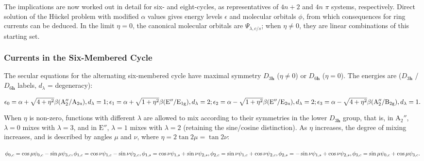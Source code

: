 The implications are now worked out in detail for six- and eight-cycles, as representatives of $4n+2$ and $4n$ $\pi$
systems, respectively.  Direct solution of the H\"uckel problem with modified $\alpha$ values gives energy levels {$\epsilon$}
and molecular orbitals {$\phi$}, from which consequences for ring currents can be deduced. In the limit $\eta = 0$,
the canonical molecular orbitals are {$\Psi_{\lambda,c/s}$}; when $\eta \ne 0$, they are linear combinations
of this starting set.

\subsubsection{Currents in the Six-Membered Cycle}

The secular equations for the alternating six-membered cycle
have maximal symmetry $D_{3\mathbf{h}}$ ($\eta \ne 0$) or $D_{6\mathbf{h}}$ ($\eta = 0$). The energies are ($D_{3\mathbf{h}}$ /$D_{6\mathbf{h}}$ labels,
$d_\lambda$ = degeneracy): 

\begin{math}
\\
\epsilon_0 = \alpha + \sqrt{4+\eta^2}\beta(\mathrm{A}_2''/\mathrm{A}_{2\mathrm{u}}), d_\lambda = 1;
\\
\\
\epsilon_1 = \alpha + \sqrt{1+\eta^2}\beta(\mathrm{E}''/\mathrm{E}_{1\mathrm{g}}), d_\lambda = 2;
\\
\\
\epsilon_2 = \alpha - \sqrt{1+\eta^2}\beta(\mathrm{E}''/\mathrm{E}_{2\mathrm{u}}), d_\lambda = 2;
\\
\\
\epsilon_3 = \alpha - \sqrt{4+\eta^2}\beta(\mathrm{A}_2''/\mathrm{B}_{2\mathrm{g}}), d_\lambda = 1.
\\
\\
\end{math}

When $\eta$ is non-zero, functions with different $\lambda$ are allowed to mix according to their symmetries in
the lower $D_{3\mathbf{h}}$ group, that is, in $\mathrm{A}_2''$, $\lambda = 0$ mixes with $\lambda = 3$, and in
$\mathrm{E}''$, $\lambda = 1$ mixes with $\lambda = 2$ (retaining the sine/cosine distinction).  As $\eta$
increases, the degree of mixing increases, and is described by angles $\mu$ and $\nu$, where
$\eta=2\tan2\mu=\tan2\nu$:

\begin{math}
\\
\phi_{0,c} = \cos \mu \psi_{0,c} - \sin \mu \psi_{3,c},
\\
\\
\phi_{1,c} = \cos \nu \psi_{1,c} - \sin \nu \psi_{2,c}, \phi_{1,s} = \cos \nu \psi_{1,s}+\sin \nu \psi_{2,s},
\\
\\
\phi_{2,c} = \sin \nu \psi_{1,c} + \cos \nu \psi_{2,c}, \phi_{2,s} = -\sin \nu \psi_{1,s}+\cos \nu \psi_{2,s},
\\
\\
\phi_{3,c} = \sin \mu \psi_{0,c} + \cos \mu \psi_{3,c}.
\\
\\
\end{math}


